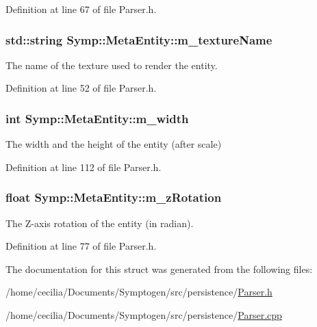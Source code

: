 Definition at line 67 of file Parser.\-h.

\hypertarget{struct_symp_1_1_meta_entity_a9b261edfae185b1a230f496055911359}{
\subsubsection[{m\-\_\-texture\-Name}]{\setlength{\rightskip}{0pt plus 5cm}std\-::string Symp\-::\-Meta\-Entity\-::m\-\_\-texture\-Name}}\label{struct_symp_1_1_meta_entity_a9b261edfae185b1a230f496055911359}
The name of the texture used to render the entity. 

Definition at line 52 of file Parser.\-h.

\hypertarget{struct_symp_1_1_meta_entity_aa06fa85ccd50804fceea67020313b02d}{
\subsubsection[{m\-\_\-width}]{\setlength{\rightskip}{0pt plus 5cm}int Symp\-::\-Meta\-Entity\-::m\-\_\-width}}\label{struct_symp_1_1_meta_entity_aa06fa85ccd50804fceea67020313b02d}
The width and the height of the entity (after scale) 

Definition at line 112 of file Parser.\-h.

\hypertarget{struct_symp_1_1_meta_entity_aa99614c3bf9787205f7e2d98695563e0}{
\subsubsection[{m\-\_\-z\-Rotation}]{\setlength{\rightskip}{0pt plus 5cm}float Symp\-::\-Meta\-Entity\-::m\-\_\-z\-Rotation}}\label{struct_symp_1_1_meta_entity_aa99614c3bf9787205f7e2d98695563e0}
The Z-\/axis rotation of the entity (in radian). 

Definition at line 77 of file Parser.\-h.



The documentation for this struct was generated from the following files\-:\begin{DoxyCompactItemize}
\item 
/home/cecilia/\-Documents/\-Symptogen/src/persistence/\hyperlink{_parser_8h}{Parser.\-h}\item 
/home/cecilia/\-Documents/\-Symptogen/src/persistence/\hyperlink{_parser_8cpp}{Parser.\-cpp}\end{DoxyCompactItemize}
